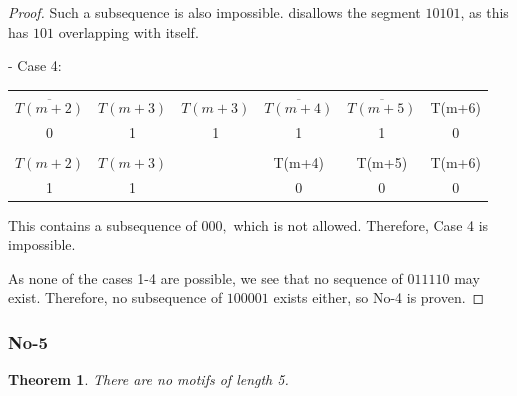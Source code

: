 \documentclass{article}
\newtheorem{theorem}{Theorem}[section]
\begin{document}
\begin{proof}
Such a subsequence is also impossible. \cite[Corollary 1]{ubiq15} disallows the segment $10101$, as this has $101$ overlapping with itself.

- Case 4:

\begin{center}
\begin{tabular}{ |c|c|c|c|c|c| } 
 \hline
 &&&&&\\
$\overline{T(m+2)}$ & $T(m+3)$ & $T(m+3)$ & $\overline{T(m+4)}$ & $\overline{T(m+5)}$ & T(m+6) \\ 
0 & 1 & 1 & 1 & 1 & 0 \\
\hline
&&&&&\\
$T(m+2)$ & $T(m+3)$ & & T(m+4) & T(m+5) & T(m+6) \\
1 & 1 & & 0 & 0 & 0 \\
 \hline
\end{tabular}
\end{center}

This contains a subsequence of $000,$ which is not allowed. Therefore, Case 4 is impossible.

As none of the cases 1-4 are possible, we see that no sequence of $011110$ may exist. Therefore, no subsequence of $100001$ exists either, so No-4 is proven.
\end{proof}

\subsubsection{No-5}

\begin{theorem}
There are no motifs of length 5.
\end{theorem}
\end{document}
